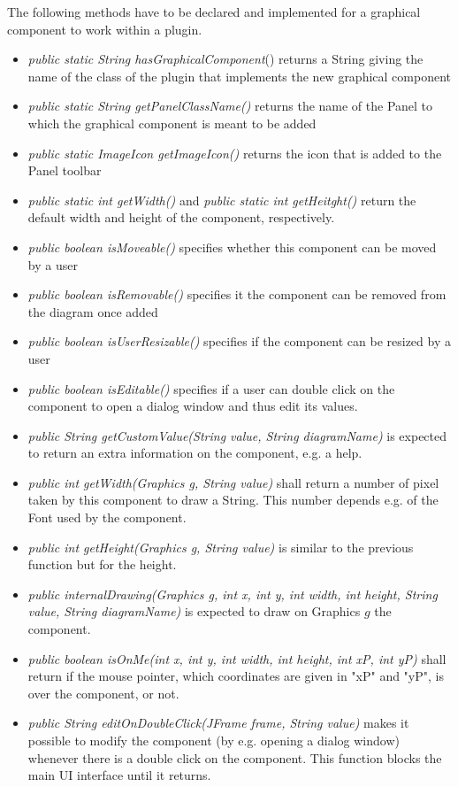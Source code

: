 \documentclass[12pt]{article}
\begin{document}
The following methods have to be declared and implemented for a graphical component to work within a plugin.
\begin{itemize}
\item \textit{public static String hasGraphicalComponent}() returns a String giving the name of the  class of the plugin that implements the new graphical component
\item \textit{public static String getPanelClassName()} returns the name of the Panel to which the graphical component is meant to be added
\item \textit{public static ImageIcon getImageIcon()} returns the icon that is added to the Panel toolbar
\item \textit{public static int getWidth()} and \textit{public static int getHeitght()} return the default width and height of the component, respectively.
\item \textit{public boolean isMoveable()} specifies whether this component can be moved by a user
\item \textit{public boolean isRemovable()} specifies it the component can be removed from the diagram once added
\item \textit{public boolean isUserResizable()} specifies if the component can be resized by a user
\item \textit{public boolean isEditable()} specifies if a user can double click on the component to open a dialog window and thus edit its values.
\item \textit{public String getCustomValue(String value, String diagramName)} is expected to return an extra information on the component, e.g. a help.
\item \textit{public int getWidth(Graphics g, String value)} shall return a number of pixel taken by this component to draw a String. This number depends e.g. of the Font used by the component.
\item \textit{public int getHeight(Graphics g, String value)} is similar to the previous function but for the height.
\item \textit{public  internalDrawing(Graphics g, int x, int y, int width, int height, String value, String diagramName)} is expected to draw on Graphics $g$ the component.
\item \textit{public  boolean isOnMe(int x, int y, int width, int height, int xP, int yP)} shall return if the mouse pointer, which coordinates are given in "xP" and "yP", is over the component, or not.
\item \textit{public  String editOnDoubleClick(JFrame frame, String value)} makes it possible to modify the component (by e.g. opening a dialog window) whenever there is a double click on the component. This function blocks the main UI interface until it returns.
\end{itemize}
\end{document}
